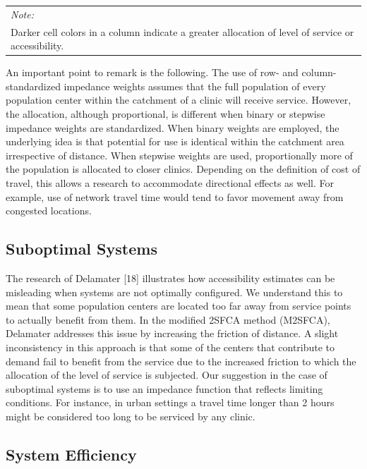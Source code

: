 \documentclass[10pt,letterpaper]{article}
\begin{document}
\begin{landscape}
\begin{table}[t]
\begin{tabular}{lrrrlllllllll}
\bottomrule
\multicolumn{13}{l}{\textit{Note: }}\\
\multicolumn{13}{l}{Darker cell colors in a column indicate a greater allocation of level of service or accessibility. }\\
\end{tabular}
\end{table}
\end{landscape}

An important point to remark is the following. The use of row- and
column-standardized impedance weights assumes that the full population
of every population center within the catchment of a clinic will receive
service. However, the allocation, although proportional, is different
when binary or stepwise impedance weights are standardized. When binary
weights are employed, the underlying idea is that potential for use is
identical within the catchment area irrespective of distance. When
stepwise weights are used, proportionally more of the population is
allocated to closer clinics. Depending on the definition of cost of
travel, this allows a research to accommodate directional effects as
well. For example, use of network travel time would tend to favor
movement away from congested locations.

\subsection{Suboptimal Systems}\label{suboptimal-systems}

The research of Delamater {[}18{]} illustrates how accessibility
estimates can be misleading when systems are not optimally configured.
We understand this to mean that some population centers are located too
far away from service points to actually benefit from them. In the
modified 2SFCA method (M2SFCA), Delamater addresses this issue by
increasing the friction of distance. A slight inconsistency in this
approach is that some of the centers that contribute to demand fail to
benefit from the service due to the increased friction to which the
allocation of the level of service is subjected. Our suggestion in the
case of suboptimal systems is to use an impedance function that reflects
limiting conditions. For instance, in urban settings a travel time
longer than 2 hours might be considered too long to be serviced by any
clinic.

\subsection{System Efficiency}\label{system-efficiency}
\end{document}
